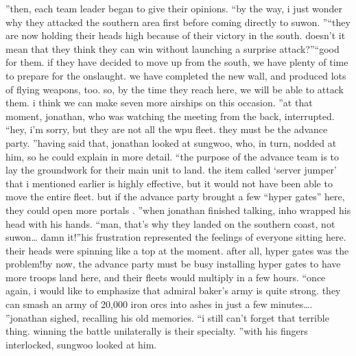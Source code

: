”then, each team leader began to give their opinions.
“by the way, i just wonder why they attacked the southern area first before coming directly to suwon.
”“they are now holding their heads high because of their victory in the south.
 doesn’t it mean that they think they can win without launching a surprise attack?”“good for them.
 if they have decided to move up from the south, we have plenty of time to prepare for the onslaught.
 we have completed the new wall, and produced lots of flying weapons, too.
 so, by the time they reach here, we will be able to attack them.
 i think we can make seven more airships on this occasion.
”at that moment, jonathan, who was watching the meeting from the back, interrupted.
“hey, i’m sorry, but they are not all the wpu fleet.
 they must be the advance party.
”having said that, jonathan looked at sungwoo, who, in turn, nodded at him, so he could explain in more detail.
“the purpose of the advance team is to lay the groundwork for their main unit to land.
the item called ‘server jumper’ that i mentioned earlier is highly effective, but it would not have been able to move the entire fleet.
 but if the advance party brought a few “hyper gates” here, they could open more portals .
”when jonathan finished talking, inho wrapped his head with his hands.
“man, that’s why they landed on the southern coast, not suwon… damn it!”his frustration represented the feelings of everyone sitting here.
 their heads were spinning like a top at the moment.
 after all, hyper gates was the problem!by now, the advance party must be busy installing hyper gates to have more troops land here, and their fleets would multiply in a few hours.
“once again, i would like to emphasize that admiral baker’s army is quite strong.
 they can smash an army of 20,000 iron orcs into ashes in just a few minutes….
”jonathan sighed, recalling his old memories.
“i still can’t forget that terrible thing.
 winning the battle unilaterally is their specialty.
”with his fingers interlocked, sungwoo looked at him.


